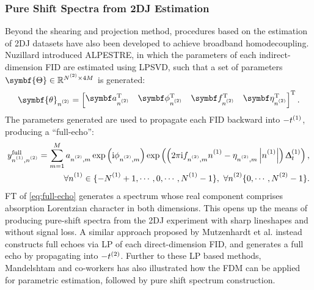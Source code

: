 \subsubsection{Pure Shift Spectra from 2DJ Estimation}
Beyond the shearing and projection method, procedures based on the estimation
of \ac{2DJ} datasets have also been developed to achieve broadband
homodecoupling. Nuzillard introduced
\ac{ALPESTRE}\cite{Nuzillard1996,Martinez2012}, in which the parameters of each
indirect-dimension FID are estimated using \ac{LPSVD}, such that a set of
parameters $\symbf{\Theta} \in \mathbb{R}^{\Ntwo \times 4M}$ is generated:
\begin{equation}
    \symbf{\theta}_{\ntwo} =
    \begin{bmatrix}
        \bda_{\ntwo}\T &
        \bdphi_{\ntwo}\T &
        \bdf_{\ntwo}\T &
        \bdeta_{\ntwo}\T
    \end{bmatrix}\T.
\end{equation}
The parameters generated are used to propagate each FID backward into
$-t^{(1)}$, producing a ``full-echo'':
\begin{equation}
    \begin{split}
        y^{\text{full}}_{\none,\ntwo} = \sum_{m=1}^{M}
            a_{\ntwo,m}
            \exp\left(\iu \phi_{\ntwo,m}\right)
            \exp\left(\left(2 \pi \iu f_{\ntwo,m} \none
            -\eta_{\ntwo,m}  \left\lvert \none \right\rvert \right)\Dtone\right), \\
        \forall \none \in \lbrace -\None + 1, \cdots, 0, \cdots, \None - 1 \rbrace,\ \forall \ntwo \lbrace 0, \cdots, \Ntwo - 1 \rbrace.
    \end{split}
    \label{eq:full-echo}
\end{equation}
\ac{FT} of \cref{eq:full-echo} generates a spectrum whose real component
comprises absorption
Lorentzian character in both dimensions. This opens up the means of producing
pure-shift spectra from the \ac{2DJ} experiment with sharp lineshapes and
without signal loss. A similar approach proposed by Mutzenhardt et al.
instead constructs full echoes via \ac{LP} of each direct-dimension
\ac{FID}, and generates a full echo by propagating into
$-t^{(2)}$\cite{Mutzenhardt1999}. Further to these \ac{LP} based methods,
Mandelshtam and co-workers has also illustrated how the \ac{FDM} can be applied
for parametric estimation, followed by pure shift spectrum
construction\cite{Mandelshtam1997,Mandelshtam1998}.

